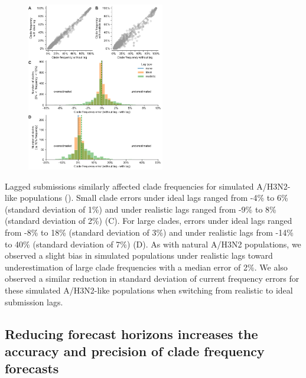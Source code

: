 \documentclass[9pt,lineno]{elife}
\begin{document}
\begin{figure}[htb!]
{\includegraphics[width=6cm]{figures/simulated_current_frequency_errors_by_delay}}\label{figsupp:simulated_current_clade_frequency_errors}
%
\label{figdata:h3n2_clade_frequencies}
\label{figsrccode:current_clade_frequency_errors}
\end{figure}

Lagged submissions similarly affected clade frequencies for simulated A/H3N2-like populations ().
Small clade errors under ideal lags ranged from -4\% to 6\% (standard deviation of 1\%) and under realistic lags ranged from -9\% to 8\% (standard deviation of 2\%) (C).
For large clades, errors under ideal lags ranged from -8\% to 18\% (standard deviation of 3\%) and under realistic lags from -14\% to 40\% (standard deviation of 7\%) (D).
As with natural A/H3N2 populations, we observed a slight bias in simulated populations under realistic lags toward underestimation of large clade frequencies with a median error of 2\%.
We also observed a similar reduction in standard deviation of current frequency errors for these simulated A/H3N2-like populations when switching from realistic to ideal submission lags.

\subsection{Reducing forecast horizons increases the accuracy and precision of clade frequency forecasts}
\end{document}
